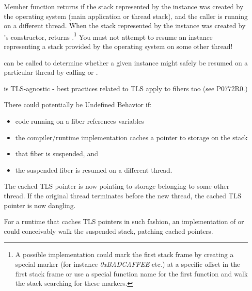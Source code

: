 \label{xthread}

Member function \canxtresume returns  if the stack represented by the
\fiber instance was created by the operating system (main application or thread
stack), and the caller is running on a different thread. When the stack
represented by the \fiber instance was created by \fiber's
constructor, \canxtresume returns .\footnote{A possible
implementation could mark the first stack frame by creating a special marker
(for instance \emph{0xBADCAFFEE} etc.) at a specific offset in the first stack
frame or use a special function name for the first function and walk the stack
searching for these markers.} You must not attempt to resume an instance
representing a stack provided by the operating system on some other thread!

\canresume can be called to determine whether a given \fiber instance might
safely be resumed on a particular thread by calling \resume or \resumewith.

\fiber is TLS-agnostic - best practices related to TLS apply to fibers too
(see P0772R0.)

There could potentially be Undefined Behavior if:
\begin{itemize}
    \item code running on a fiber references  variables
    \item the compiler/runtime implementation caches a pointer
          to  storage on the stack
    \item that fiber is suspended, and
    \item the suspended fiber is resumed on a different thread.
\end{itemize}

The cached TLS pointer is now pointing to storage belonging to some other
thread. If the original thread terminates before the new thread, the cached
TLS pointer is now dangling.

For a runtime that caches TLS pointers in such fashion, an implementation
of \xtresume or\\
\xtresumewith could conceivably walk the suspended stack,
patching cached pointers.
